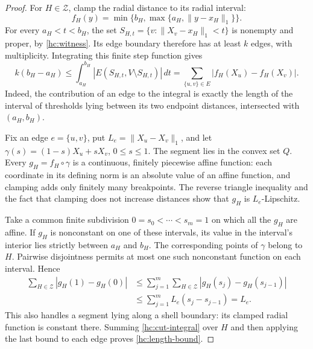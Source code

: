 \begin{proof}
For \(H\in\mathcal Z\), clamp the radial distance to its radial
interval:
\[
 f_H(y)=\min\{b_H,\max\{a_H,\|y-x_H\|_1\}\}.
\]
For every \(a_H<t<b_H\), the set
\(S_{H,t}=\{v:\|X_v-x_H\|_1<t\}\) is nonempty and proper, by
\eqref{hc:witness}.  Its edge boundary therefore has at least \(k\)
edges, with multiplicity.  Integrating this finite step function gives
\begin{equation}
\label{hc:cut-integral}
 k(b_H-a_H)
 \le \int_{a_H}^{b_H}|E(S_{H,t},V\setminus S_{H,t})|\,dt
 =\sum_{\{u,v\}\in E}|f_H(X_u)-f_H(X_v)|.
\end{equation}
Indeed, the contribution of an edge to the integral is exactly the
length of the interval of thresholds lying between its two endpoint
distances, intersected with \((a_H,b_H)\).

Fix an edge \(e=\{u,v\}\), put \(L_e=\|X_u-X_v\|_1\), and let
\(\gamma(s)=(1-s)X_u+sX_v\), \(0\le s\le1\).  The segment lies in
the convex set \(Q\).  Every \(g_H=f_H\circ\gamma\) is a continuous,
finitely piecewise affine function: each coordinate in its defining
norm is an absolute value of an affine function, and clamping adds
only finitely many breakpoints.  The reverse triangle inequality and
the fact that clamping does not increase distances show that
\(g_H\) is \(L_e\)-Lipschitz.

Take a common finite subdivision \(0=s_0<\cdots<s_m=1\) on which all
the \(g_H\) are affine.  If \(g_H\) is nonconstant on one of these
intervals, its value in the interval's interior lies strictly between
\(a_H\) and \(b_H\).  The corresponding points of \(\gamma\) belong
to \(H\).  Pairwise disjointness permits at most one such nonconstant
function on each interval.  Hence
\begin{align*}
 \sum_{H\in\mathcal Z}|g_H(1)-g_H(0)|
 &\le \sum_{j=1}^m\sum_{H\in\mathcal Z}
       |g_H(s_j)-g_H(s_{j-1})|\\
 &\le \sum_{j=1}^m L_e(s_j-s_{j-1})=L_e.
\end{align*}
This also handles a segment lying along a shell boundary: its clamped
radial function is constant there.  Summing
\eqref{hc:cut-integral} over \(H\) and then applying the last bound to
each edge proves \eqref{hc:length-bound}.
\end{proof}

